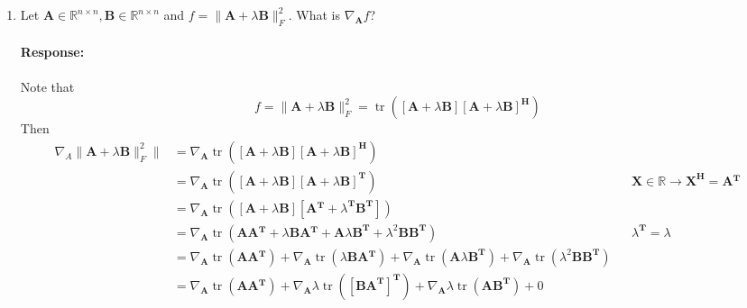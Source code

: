 \documentclass [11pt] {article}
\newcommand{\R}{\mathbb{R}}
\newcommand{\T}{\bf{T}}
\newcommand{\A}{\bf{A}}
\newcommand{\AT}{\bf{A$^{\T}$}}
\newcommand{\X}{\bf{X}}
\newcommand{\B}{\bf{B}}
\newenvironment{response}{\begin{responseframe}\vspace{-10pt}\paragraph{Response:}}{\end{responseframe}}
\DeclareMathOperator{\tr}{tr}
\renewcommand{\bf}[1]{\textbf{{#1}}}
\begin{document}
\begin{enumerate}
\begin{enumerate}[itemsep=10pt]
\begin{response}
\begin{align*}
                                      &= \B^{\T} + \B + (\A \B + \B \A)^{\T} && \text{mat. cookbook } (103), (107) \\
                        \nabla_{\A} f &= \B^{\T} + \B + \B^{\T} \A^{\T} + \A^{\T} \B^{\T} \\
                    \end{align*}
                \end{response}
            \item Let $\A \in \R^{n \times n}, \B \in \R^{n \times n}$ and 
                $f = \| \A + \lambda \B \|^{2}_{F}$. What is $\nabla_{\A} f$?
                \begin{adjustwidth}{-7.7em}{-3em}
                    \small{
                        \begin{response}
                            Note that
                            \[f = \| \A + \lambda \B \|^{2}_{F} = \tr \left( \left[ \A + \lambda \B \right] \left[ \A + \lambda \B \right]^{\bf{H}} \right)\]
                            Then
                            \begin{align*}
                                \nabla_{A} \| \A + \lambda \B \|^{2}_{F} \| 
                        &= \nabla_{\A} \tr \left( \left[ \A + \lambda \B \right] \left[ \A + \lambda \B \right]^{\bf{H}} \right) \\
                        &= \nabla_{\A} \tr \left( \left[ \A + \lambda \B \right] \left[ \A + \lambda \B \right]^{\T} \right) && \X \in \R \to \X^{\bf{H}} = \AT \\
                        &= \nabla_{\A} \tr \left( \left[ \A + \lambda \B \right] \left[ \AT + \lambda^{\T} \B^{\T} \right] \right) \\ 
                        &= \nabla_{\A} \tr \left( \A \AT + \lambda \B \AT + \A \lambda \B^{\T}  + \lambda^2 \B \B^{\T} \right ) && \lambda^{\T} = \lambda \\
                        &= 
                        \nabla_{\A} \tr \left( \A \AT \right) +
                        \nabla_{\A} \tr \left( \lambda \B \AT \right) +
                        \nabla_{\A} \tr \left( \A \lambda \B^{\T} \right) +
                        \nabla_{\A} \tr \left( \lambda^2 \B \B^{\T} \right) \\
                        &= 
                        \nabla_{\A} \tr \left( \A \AT \right) +
                        \nabla_{\A} \lambda \tr \left( \left[ \B \A^{\T} \right]^{\T} \right) +
                        \nabla_{\A} \lambda \tr \left( \A \B^{\T} \right) +
                        0

\end{align*}
\end{response}}
\end{adjustwidth}
\end{enumerate}
\end{enumerate}
\end{document}
